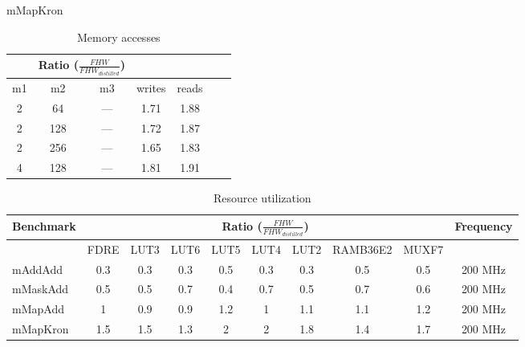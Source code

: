 \begin{table}[h]
\begin{minipage}{0.45\linewidth}
\end{minipage}
\hfill
\begin{minipage}{0.45\linewidth}
\centering
\caption*{mMapKron}
\begin{tabular}{|c|c|c|c|c|c|c|} 
\hline
\rowcolor{LightBlue}
\multicolumn{3}{|c|}{Matrices dimensions} & \multicolumn{2}{c|}{Ratio ($\frac{FHW}{FHW_{distilled}}$)}\\
\hline
m1 & m2 & m3 & writes & reads\\ 
\hline
2 & 64 & --- & 1.71 & 1.88\\ 
2 & 128 & --- & 1.72 & 1.87\\
2 & 256 & --- & 1.65 & 1.83\\
4 & 128 & --- & 1.81 & 1.91\\
\hline
\end{tabular}
\end{minipage}

\caption{Memory accesses}
\label{tab:mem_results}
\end{table}

\begin{table}[h]
\scriptsize
\centering
\begin{tabular}{|l|c|c|c|c|c|c|c|c|c|} 
\hline
\rowcolor{LightBlue}

{Benchmark} & \multicolumn{8}{c|}{Ratio (${\frac{FHW}{FHW_{distilled}}}$)} & {Frequency}\\
\hline
{} & FDRE & LUT3 & LUT6 & LUT5 & LUT4 & LUT2 & RAMB36E2 & MUXF7 & {} \\
\hline
mAddAdd & 0.3 & 0.3 & 0.3 & 0.5 & 0.3 & 0.3 & 0.5 & 0.5 & 200 MHz\\ 
mMaskAdd & 0.5 & 0.5 & 0.7 & 0.4 & 0.7 & 0.5 & 0.7 & 0.6 & 200 MHz\\
mMapAdd & 1 & 0.9 & 0.9 & 1.2 & 1 & 1.1 & 1.1 & 1.2 & 200 MHz\\
mMapKron & 1.5 & 1.5 & 1.3 & 2 & 2 & 1.8 & 1.4 & 1.7 & 200 MHz\\
\hline
\end{tabular}
\caption{Resource utilization}
\label{tab:resource_util}
\end{table}
\pagebreak
